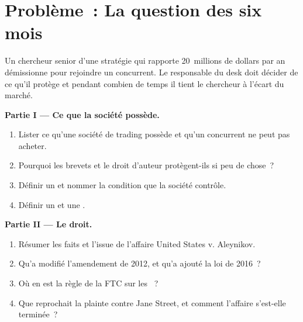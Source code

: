 \section{Problème~: La question des six mois}

\begin{problem}\label{pb:fm:intellectual-property-and-non-competes:1}
Un chercheur senior d'une stratégie qui rapporte 20~millions de dollars par an démissionne pour rejoindre un concurrent. Le responsable du desk doit décider de ce qu'il protège et
pendant combien de temps il tient le chercheur à l'écart du marché.

\medskip\noindent\textbf{Partie I --- Ce que la société possède.}
\begin{enumerate}
\item Lister ce qu'une société de trading possède et qu'un concurrent ne peut pas acheter.
\item Pourquoi les brevets et le droit d'auteur protègent-ils si peu de chose~?
\item Définir un  et nommer la condition que la société contrôle.
\item Définir un  et une .
\end{enumerate}

\medskip\noindent\textbf{Partie II --- Le droit.}
\begin{enumerate}[resume]
\item Résumer les faits et l'issue de l'affaire United States v. Aleynikov.
\item Qu'a modifié l'amendement de 2012, et qu'a ajouté la loi de 2016~?
\item Où en est la règle de la FTC sur les ~?
\item Que reprochait la plainte contre Jane Street, et comment l'affaire s'est-elle terminée~?
\end{enumerate}


\end{problem}
